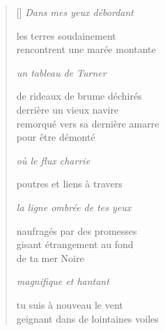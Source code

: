 \documentclass[12pt,a4paper]{article}
\begin{document}
\begin{verse}[\versewidth]
  \emph{Dans mes yeux débordant}

  les terres soudainement \\
  rencontrent une marée montante

  \emph{un tableau de Turner}

  de rideaux de brume déchirés \\
  derrière un vieux navire \\
  remorqué vers sa dernière amarre \\
  pour être démonté

  \emph{où le flux charrie}

  poutres et liens à travers

  \emph{la ligne ombrée de tes yeux}

  naufragés par des promesses \\
  gisant étrangement au fond \\
  de ta mer Noire

  \emph{magnifique et hantant}

  tu suis à nouveau le vent \\
  geignant dans de lointaines voiles
\end{verse}


\newpage

\poemtitle{}

\settowidth{\versewidth}{Vous ne pouvez que ressentir et je vois}

\bigskip
\end{document}
